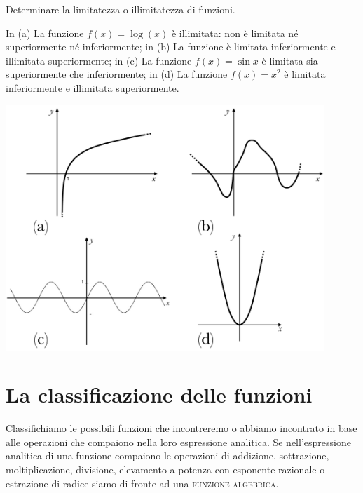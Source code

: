 \begin{esempio} Determinare la limitatezza o illimitatezza di funzioni.

\begin{minipage}{.24\textwidth}
In (a) La funzione \(f(x)=\log(x)\) è illimitata: non è limitata né 
superiormente né inferiormente; 
in (b) La funzione è limitata inferiormente e 
illimitata superiormente; in (c) La funzione \(f(x)=\sin{x}\) è limitata sia 
superiormente che inferiormente; in (d) La funzione \(f(x)=x^2\) è limitata 
inferiormente e illimitata superiormente.
\end{minipage}
\begin{minipage}{.74\textwidth}
\begin{center}
  \includegraphics[width=0.9\textwidth]{img/funz_12a.png}
\end{center}
\end{minipage}

\end{esempio}

\section{La classificazione delle funzioni}
Classifichiamo le possibili funzioni che incontreremo o abbiamo incontrato in 
base alle operazioni che compaiono nella loro espressione analitica. Se 
nell'espressione analitica di una funzione compaiono le operazioni di 
addizione, sottrazione, moltiplicazione, divisione, elevamento a potenza con 
esponente razionale o estrazione di radice siamo di fronte ad una 
\textsc{funzione algebrica}.\\

